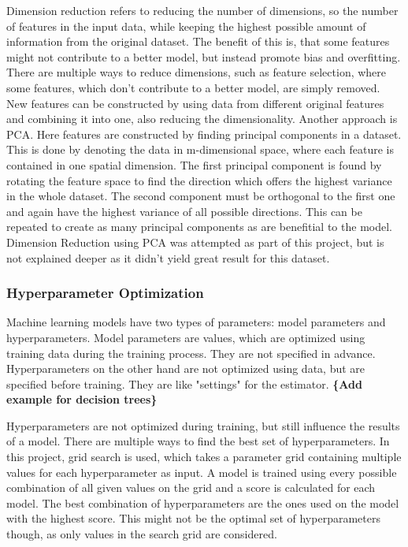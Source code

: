 Dimension reduction refers to reducing the number of dimensions, so the number of
features in the input data, while keeping the highest possible amount of information from
the original dataset. The benefit of this is, that some features might not contribute to a better model,
but instead promote bias and overfitting.
There are multiple ways to reduce dimensions, such as feature selection, where some features, which don't
contribute to a better model, are simply removed.
New features can be constructed by using data from different original features and
combining it into one, also reducing the dimensionality.
Another approach is \ac{PCA}. Here features are constructed by finding
principal components in a dataset. This is done by denoting the data in m-dimensional space,
where each feature is contained in one spatial dimension.
The first principal component is found by rotating the feature space to find the direction
which offers the highest variance in the whole dataset.
The second component must be orthogonal to the first one and again have the highest variance
of all possible directions. This can be repeated to create as many principal components as are benefitial to the model.
Dimension Reduction using \ac{PCA} was attempted as part of this project,
but is not explained deeper as it didn't yield great result for this dataset.

\subsubsection{Hyperparameter Optimization}

Machine learning models have two types of parameters: model parameters and hyperparameters.
Model parameters are values, which are optimized using training data during the training process.
They are not specified in advance.
Hyperparameters on the other hand are not optimized using data, but are specified before training.
They are like "settings" for the estimator. 
\textbf{\{Add example for decision trees\}}

Hyperparameters are not optimized during training, but still influence the results of a model.
There are multiple ways to find the best set of hyperparameters.
In this project, grid search is used, which takes a parameter grid containing
multiple values for each hyperparameter as input.
A model is trained using every possible combination of all given values on the grid and a score
is calculated for each model. The best combination of hyperparameters are the ones used on the model
with the highest score. This might not be the optimal set of hyperparameters though, as only values
in the search grid are considered.

